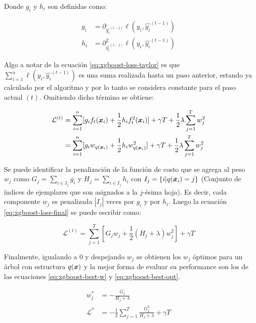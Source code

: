 Donde $g_i$ y $h_i$ son definidas como:

\begin{align}
    g_i &= \partial_{\hat{y_{i}}^{(t-1)}} \ell\left(y_i, \hat{y_{i}}^{(t-1)}\right) \\
    h_i &= \partial_{\hat{y_{i}}^{(t-1)}}^{2} \ell\left(y_i, \hat{y_{i}}^{(t-1)}\right)
\end{align}

Algo a notar de la ecuación \ref{eq:xgboost-loss-taylor} es que $\sum_{i =
1}^{n} \ell\left(y_i, \hat{y_{i}}^{(t-1)} \right)$ es una suma realizada hasta
un paso anterior, estando ya calculado por el algoritmo y por lo tanto se
considera constante para el paso actual $(t)$. Omitiendo dicho término se
obtiene:

\begin{align}
    \mathcal{L}^{(t)} &= \sum_{i = 1}^{n} [
        g_i f_t(\boldsymbol{x}_i) +
                \frac{1}{2} h_i f_t^{2}(\boldsymbol{x}_i)
        ] + \gamma T + \frac{1}{2} \lambda \sum_{j=1}^{T} w_{j}^{2} \\
                      &= \sum_{i = 1}^{n} [ \label{eq:xgboost-loss-final}
                        g_i w_{q(\boldsymbol{x}_i)} +
                                \frac{1}{2} h_i w_{q(\boldsymbol{x}_i)}^{2}
                        ] + \gamma T + \frac{1}{2} \lambda \sum_{j=1}^{T} w_{j}^{2}
\end{align}

Se puede identificar la penalización de la función de costo que se agrega al
peso $w_j$ como $G_{j} = \sum_{i \in I_j} g_i$ y $H_j = \sum_{i \in I_j} h_i$
con $I_j = \{i | q(\boldsymbol{x}_i) = j\}$ (Conjunto de índices de ejemplares que son
asignados a la $j$-ésima hoja). Es decir, cada componente $w_j$ es penalizada
$|I_{j}|$ veces por $g_i$ y por $h_i$. Luego la ecuación
\ref{eq:xgboost-loss-final} se puede escribir como:

\begin{equation}
    \mathcal{L}^{(t)} = \sum_{j = 1}^{T}[G_j w_j + \frac{1}{2} (H_j + \lambda)w_j^2] + \gamma T
\end{equation}

Finalmente, igualando a $0$ y despejando $w_j$ se obtienen los $w_j$ óptimos para
un árbol con estructura $q(\boldsymbol{x})$ y la mejor forma de evaluar su performance
son los de las ecuaciones \ref{eq:xgboost-best-w} y \ref{eq:xgboost-best-opt}.

\begin{align}
    w_{j}^{*} &= - \frac{G_j}{H_j + \lambda} \label{eq:xgboost-best-w}\\
    \mathcal{L}^{*} &= -\frac{1}{2} \sum_{j=1}^{T} \frac{G_{j}^{2}}{H_j + \lambda} + \gamma T \label{eq:xgboost-best-opt}
\end{align}


